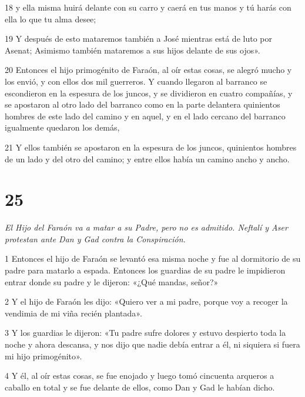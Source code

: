 \par 18 y ella misma huirá delante con su carro y caerá en tus manos y tú harás con ella lo que tu alma desee;

\par 19 Y después de esto mataremos también a José mientras está de luto por Asenat; Asimismo también mataremos a sus hijos delante de sus ojos».

\par 20 Entonces el hijo primogénito de Faraón, al oír estas cosas, se alegró mucho y los envió, y con ellos dos mil guerreros. Y cuando llegaron al barranco se escondieron en la espesura de los juncos, y se dividieron en cuatro compañías, y se apostaron al otro lado del barranco como en la parte delantera quinientos hombres de este lado del camino y en aquel, y en el lado cercano del barranco igualmente quedaron los demás,

\par 21 Y ellos también se apostaron en la espesura de los juncos, quinientos hombres de un lado y del otro del camino; y entre ellos había un camino ancho y ancho.


\chapter{25}

\par \textit{El Hijo del Faraón va a matar a su Padre, pero no es admitido. Neftalí y Aser protestan ante Dan y Gad contra la Conspiración.}


\par 1 Entonces el hijo de Faraón se levantó esa misma noche y fue al dormitorio de su padre para matarlo a espada. Entonces los guardias de su padre le impidieron entrar donde su padre y le dijeron: «¿Qué mandas, señor?»

\par 2 Y el hijo de Faraón les dijo: «Quiero ver a mi padre, porque voy a recoger la vendimia de mi viña recién plantada».

\par 3 Y los guardias le dijeron: «Tu padre sufre dolores y estuvo despierto toda la noche y ahora descansa, y nos dijo que nadie debía entrar a él, ni siquiera si fuera mi hijo primogénito».

\par 4 Y él, al oír estas cosas, se fue enojado y luego tomó cincuenta arqueros a caballo en total y se fue delante de ellos, como Dan y Gad le habían dicho.

